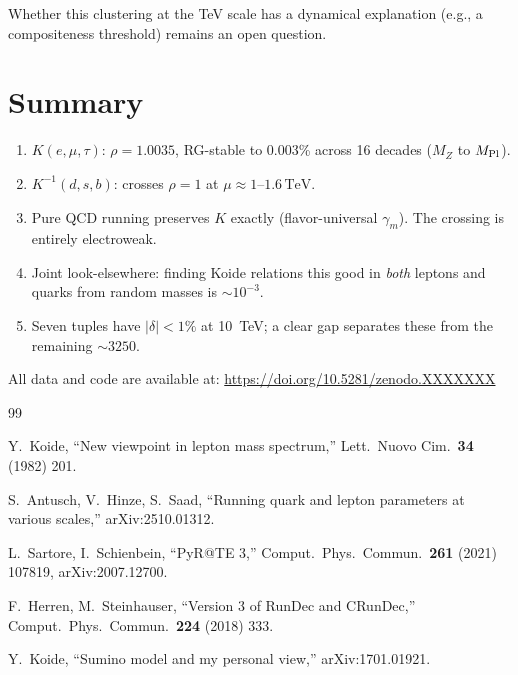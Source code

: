 \documentclass[11pt,a4paper]{article}
\newcommand{\TeV}{\,\text{TeV}}
\newcommand{\MZ}{M_Z}
\newcommand{\MPl}{M_{\rm Pl}}
\begin{document}
\noindent Whether this clustering at the TeV scale has a dynamical explanation
(e.g., a compositeness threshold) remains an open question.

\section{Summary}
\label{sec:summary}

\begin{enumerate}
\item $K(e,\mu,\tau)$: $\rho = 1.0035$, RG-stable to 0.003\% across
  16 decades ($\MZ$ to $\MPl$).
\item $K^{-1}(d,s,b)$: crosses $\rho = 1$ at $\mu \approx 1$--$1.6\TeV$.
\item Pure QCD running preserves $K$ exactly (flavor-universal $\gamma_m$).
  The crossing is entirely electroweak.
\item Joint look-elsewhere: finding Koide relations this good in
  \emph{both} leptons and quarks from random masses is $\sim 10^{-3}$.
\item Seven tuples have $|\delta| < 1\%$ at 10~TeV; a clear gap separates
  these from the remaining $\sim 3250$.
\end{enumerate}

All data and code are available at:
\url{https://doi.org/10.5281/zenodo.XXXXXXX}

\begin{thebibliography}{99}

  Y.~Koide,
  ``New viewpoint in lepton mass spectrum,''
  Lett.\ Nuovo Cim.\ \textbf{34} (1982) 201.

  S.~Antusch, V.~Hinze, S.~Saad,
  ``Running quark and lepton parameters at various scales,''
  arXiv:2510.01312.

  L.~Sartore, I.~Schienbein,
  ``PyR@TE 3,''
  Comput.\ Phys.\ Commun.\ \textbf{261} (2021) 107819,
  arXiv:2007.12700.

  F.~Herren, M.~Steinhauser,
  ``Version 3 of RunDec and CRunDec,''
  Comput.\ Phys.\ Commun.\ \textbf{224} (2018) 333.

  Y.~Koide,
  ``Sumino model and my personal view,''
  arXiv:1701.01921.

\end{thebibliography}
\end{document}
